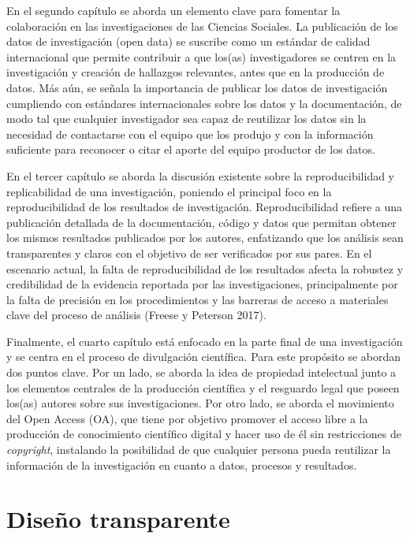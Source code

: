 \documentclass[
  spanish,
  letterpaper,
  DIV=11,
  numbers=noendperiod]{scrreprt}
\begin{document}
En el segundo capítulo se aborda un elemento clave para fomentar la
colaboración en las investigaciones de las Ciencias Sociales. La
publicación de los datos de investigación (open data) se suscribe como
un estándar de calidad internacional que permite contribuir a que
los(as) investigadores se centren en la investigación y creación de
hallazgos relevantes, antes que en la producción de datos. Más aún, se
señala la importancia de publicar los datos de investigación cumpliendo
con estándares internacionales sobre los datos y la documentación, de
modo tal que cualquier investigador sea capaz de reutilizar los datos
sin la necesidad de contactarse con el equipo que los produjo y con la
información suficiente para reconocer o citar el aporte del equipo
productor de los datos.

En el tercer capítulo se aborda la discusión existente sobre la
reproducibilidad y replicabilidad de una investigación, poniendo el
principal foco en la reproducibilidad de los resultados de
investigación. Reproducibilidad refiere a una publicación detallada de
la documentación, código y datos que permitan obtener los mismos
resultados publicados por los autores, enfatizando que los análisis sean
transparentes y claros con el objetivo de ser verificados por sus pares.
En el escenario actual, la falta de reproducibilidad de los resultados
afecta la robustez y credibilidad de la evidencia reportada por las
investigaciones, principalmente por la falta de precisión en los
procedimientos y las barreras de acceso a materiales clave del proceso
de análisis (Freese y Peterson 2017).

Finalmente, el cuarto capítulo está enfocado en la parte final de una
investigación y se centra en el proceso de divulgación científica. Para
este propósito se abordan dos puntos clave. Por un lado, se aborda la
idea de propiedad intelectual junto a los elementos centrales de la
producción científica y el resguardo legal que poseen los(as) autores
sobre sus investigaciones. Por otro lado, se aborda el movimiento del
Open Access (OA), que tiene por objetivo promover el acceso libre a la
producción de conocimiento científico digital y hacer uso de él sin
restricciones de \emph{copyright}, instalando la posibilidad de que
cualquier persona pueda reutilizar la información de la investigación en
cuanto a datos, procesos y resultados.


\chapter{Diseño transparente}\label{diseuxf1o-transparente}
\end{document}
